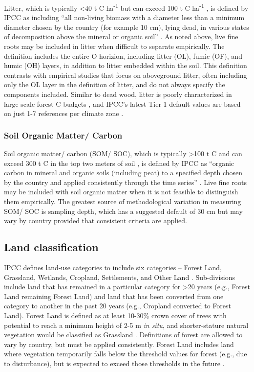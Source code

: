\documentclass[, manuscript]{copernicus}
\begin{document}
Litter, which is typically \textless40 t C ha\textsuperscript{-1} but
can exceed 100 t C ha\textsuperscript{-1}
\citep{anderson-teixeira_carbon_2021}, is defined by IPCC as including
``all non-living biomass with a diameter less than a minimum diameter
chosen by the country (for example 10 cm), lying dead, in various states
of decomposition above the mineral or organic soil''
\citep{ipcc_good_2003, ipcc_2006_2006}. As noted above, live fine roots
may be included in litter when difficult to separate empirically. The
definition includes the entire O horizion, including litter (OL), fumic
(OF), and humic (OH) layers, in addition to litter embedded within the
soil. This definition contrasts with empirical studies that focus on
aboveground litter, often including only the OL layer in the definition
of litter, and do not always specify the components included. Similar to
dead wood, litter is poorly characterized in large-scale forest C
budgets \citep{pan_large_2011, harris_global_2021}, and IPCC's latest
Tier 1 default values are based on just 1-7 references per climate zone
\citep[Table 2.2 in][]{ipcc_2019_2019}.

\subsubsection{Soil Organic Matter/ Carbon}

Soil organic matter/ carbon (SOM/ SOC), which is typically
\textgreater100 t C and can exceed 300 t C in the top two meters of soil
\citep{sanderman_soil_2017}, is defined by IPCC as ``organic carbon in
mineral and organic soils (including peat) to a specified depth chosen
by the country and applied consistently through the time series''
\citep{ipcc_good_2003, ipcc_2006_2006}. Live fine roots may be included
with soil organic matter when it is not feasible to distinguish them
empirically. The greatest source of methodological variation in
measuring SOM/ SOC is sampling depth, which has a suggested default of
30 cm but may vary by country provided that consistent criteria are
applied.

\subsection{Land classification}

IPCC defines land-use categories to include six categories -- Forest
Land, Grassland, Wetlands, Cropland, Settlements, and Other Land
\citep{ipcc_2006_2006}. Sub-divisions include land that has remained in
a particular category for \textgreater20 years (e.g., Forest Land
remaining Forest Land) and land that has been converted from one
category to another in the past 20 years (e.g., Cropland converted to
Forest Land). Forest Land is defined as at least 10-30\% crown cover of
trees with potential to reach a minimum height of 2-5 m \emph{in situ},
and shorter-stature natural vegetation would be classified as Grassland
\citep{ipcc_good_2003}. Definitions of forest are allowed to vary by
country, but must be applied consistently. Forest Land includes land
where vegetation temporarily falls below the threshold values for forest
(e.g., due to disturbance), but is expected to exceed those thresholds
in the future \citep{ipcc_good_2003}.
\end{document}
